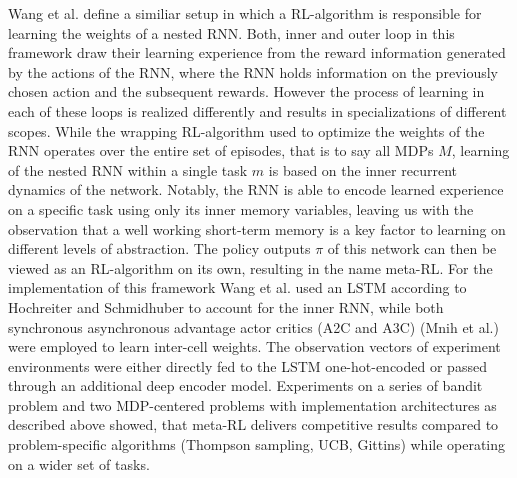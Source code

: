 \documentclass[letterpaper, 10 pt, conference]{ieeeconf}  %
\begin{document}
Wang et al.\cite{wangLearningReinforcementLearn2016} define a similiar setup in which a RL-algorithm is responsible for 
learning the weights of a nested RNN. Both, inner and outer loop 
in this framework draw their learning experience from the reward information generated by the actions of the RNN, where 
the RNN holds information on the previously chosen action and the subsequent rewards. However the process of learning
in each of these loops is realized differently and results in specializations of different scopes. While the wrapping RL-algorithm used to 
optimize the weights of the RNN operates over the entire set of episodes, that is to say all MDPs $M$, learning of the nested RNN 
within a single task $m$ is based on the inner recurrent dynamics of the network. Notably, the RNN 
is able to encode learned experience on a specific task using only its inner memory variables, leaving us with the observation
that a well working short-term memory is a key factor to learning on different levels of abstraction. 
The policy outputs $\pi$ of this network can then
be viewed as an RL-algorithm on its own, resulting in the name meta-RL. For the implementation of this framework Wang et al.
\cite{wangLearningReinforcementLearn2016} 
used an LSTM according to Hochreiter and Schmidhuber \cite{hochreiterLongShortTermMemory1997} to account for the inner RNN, while both synchronous 
asynchronous advantage actor critics (A2C and A3C) (Mnih et al.) were employed to learn inter-cell weights.
The observation vectors of experiment environments
were either directly fed to the LSTM one-hot-encoded or passed through an additional deep encoder model\cite{wangLearningReinforcementLearn2016}. 
Experiments on a series of bandit problem and two
MDP-centered problems with implementation architectures as described above showed, that meta-RL delivers 
competitive results compared to problem-specific algorithms (Thompson sampling, UCB, Gittins) while operating on a 
wider set of tasks. \newline
\end{document}
